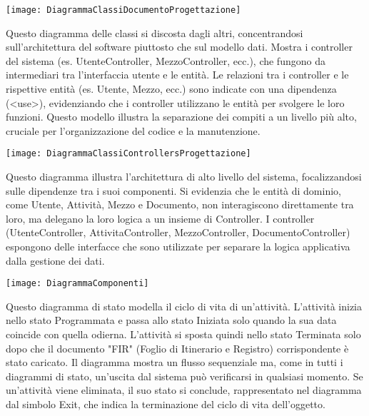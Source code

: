 \documentclass[a4paper]{report}
\begin{document}
\begin{figure*}[!ht]
    \centering
    \texttt{[image: DiagrammaClassiDocumentoProgettazione]}
\end{figure*}

\clearpage
{}

Questo diagramma delle classi si discosta dagli altri, concentrandosi sull'architettura del software piuttosto che sul modello dati. Mostra i controller del sistema (es. UtenteController, MezzoController, ecc.), che fungono da intermediari tra l'interfaccia utente e le entità. Le relazioni tra i controller e le rispettive entità (es. Utente, Mezzo, ecc.) sono indicate con una dipendenza (<use>), evidenziando che i controller utilizzano le entità per svolgere le loro funzioni. Questo modello illustra la separazione dei compiti a un livello più alto, cruciale per l'organizzazione del codice e la manutenzione.

\begin{figure*}[!ht]
    \centering
    \texttt{[image: DiagrammaClassiControllersProgettazione]}
\end{figure*}

\clearpage
{}
Questo diagramma illustra l'architettura di alto livello del sistema, focalizzandosi sulle dipendenze tra i suoi componenti. Si evidenzia che le entità di dominio, come Utente, Attività, Mezzo e Documento, non interagiscono direttamente tra loro, ma delegano la loro logica a un insieme di Controller. I controller (UtenteController, AttivitaController, MezzoController, DocumentoController) espongono delle interfacce che sono utilizzate per separare la logica applicativa dalla gestione dei dati. 

\begin{figure*}[!ht]
    \centering
    \texttt{[image: DiagrammaComponenti]}
\end{figure*}

\clearpage
{}

Questo diagramma di stato modella il ciclo di vita di un'attività. L'attività inizia nello stato Programmata e passa allo stato Iniziata solo quando la sua data coincide con quella odierna. L'attività si sposta quindi nello stato Terminata solo dopo che il documento "FIR" (Foglio di Itinerario e Registro) corrispondente è stato caricato. Il diagramma mostra un flusso sequenziale ma, come in tutti i diagrammi di stato, un'uscita dal sistema può verificarsi in qualsiasi momento. Se un'attività viene eliminata, il suo stato si conclude, rappresentato nel diagramma dal simbolo Exit, che indica la terminazione del ciclo di vita dell'oggetto.
\end{document}
